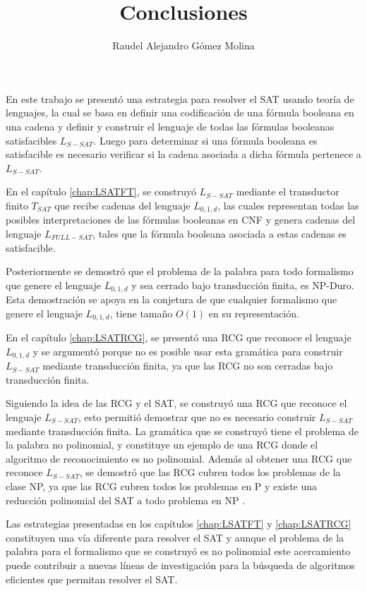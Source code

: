 \documentclass[12pt]{article}
\title{Conclusiones}
\author{Raudel Alejandro Gómez Molina}
\begin{document}
\maketitle

En este trabajo se presentó una estrategia para resolver el SAT usando teoría de lenguajes, la cual se basa en definir
una codificación de una fórmula booleana en una cadena y definir y construir el lenguaje de todas las fórmulas booleanas
satisfacibles $L_{S-SAT}$. Luego para determinar si una fórmula booleana es satisfacible es necesario verificar si la cadena asociada
a dicha fórmula pertenece a $L_{S-SAT}$.

En el capítulo \ref{chap:LSATFT}, se construyó $L_{S-SAT}$ mediante el transductor finito $T_{SAT}$ que recibe
cadenas del lenguaje $L_{0,1,d}$, las cuales representan todas las posibles interpretaciones de las fórmulas
booleanas en CNF y genera cadenas del lenguaje $L_{FULL-SAT}$, tales que la fórmula booleana asociada a estas
cadenas es satisfacible.

Posteriormente se demostró que el problema de la palabra para todo formalismo que genere
el lenguaje $L_{0,1,d}$ y sea cerrado bajo transducción finita, es NP-Duro. Esta demostración se apoya en la conjetura
de que cualquier formalismo que genere el lenguaje $L_{0,1,d}$, tiene tamaño $O(1)$ en su representación.

En el capítulo \ref{chap:LSATRCG}, se presentó una RCG que reconoce el lenguaje $L_{0,1,d}$ y se argumentó porque no es posible
usar esta gramática para construir $L_{S-SAT}$ mediante transducción finita, ya que las RCG no son cerradas bajo transducción finita.

Siguiendo la idea de las RCG y el SAT, se construyó una RCG que reconoce el lenguaje $L_{S-SAT}$, esto permitió demostrar
que no es necesario construir $L_{S-SAT}$ mediante transducción finita. La gramática que se construyó tiene el problema
de la palabra no polinomial, y constituye un ejemplo de una RCG donde el algoritmo de reconocimiento es no polinomial.
Además al obtener una RCG que reconoce $L_{S-SAT}$, se demostró que las RCG cubren todos los problemas de la clase NP,
ya que las RCG cubren todos los problemas en P \cite{mainRCGBib} y existe una reducción polinomial del SAT a todo problema en NP \cite{authomataTheory}.

Las estrategias presentadas en los capítulos \ref{chap:LSATFT} y \ref{chap:LSATRCG} constituyen una vía diferente
para resolver el SAT y aunque el problema de la palabra para el formalismo que se construyó es no polinomial
este acercamiento puede contribuir a nuevas líneas de investigación para la búsqueda de algoritmos eficientes que permitan
resolver el SAT.   
\end{document}
